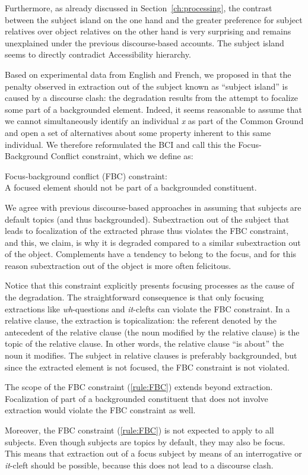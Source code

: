 Furthermore, as already discussed in Section~\ref{ch:processing}, the contrast between the subject island on the one hand and the greater preference for subject relatives over object relatives on the other hand is very surprising and remains unexplained under the previous discourse-based accounts. The subject island seems to directly contradict  Accessibility hierarchy. 

Based on experimental data from English and French, we proposed in \citet[rule (8)]{Abeille.2020.Cognition} that the penalty observed in extraction out of the subject known as ``subject island''
is caused by a discourse clash: the degradation results from the attempt to focalize some part of a backgrounded element. Indeed, it seems reasonable to assume that we cannot simultaneously identify an individual \emph{x} as part of the Common Ground and open a set of alternatives about some property inherent to this same individual. 
We therefore reformulated the BCI and call this the Focus-Background Conflict constraint, which we define as:

\ea Focus-background conflict (FBC) constraint:\\
A focused element should not be part of a backgrounded constituent.
\label{rule:FBC}
\z 

We agree with previous discourse-based approaches in assuming that subjects are default topics (and thus backgrounded). Subextraction out of the subject that leads to focalization of the extracted phrase thus violates the FBC constraint, and this, we claim, is why it is degraded compared to a similar subextraction out of the object. Complements have a tendency to belong to the focus, and for this reason subextraction out of the object is more often felicitous. 

Notice that this constraint explicitly presents focusing processes as the cause of the degradation. The straightforward consequence is that only focusing extractions like \emph{wh}-questions and \emph{it}-clefts can violate the FBC constraint. In a relative clause, the extraction is topicalization: the referent denoted by the antecedent of the relative clause (the noun modified by the relative clause) is the topic of the relative clause. In other words, the relative clause ``is about'' the noun it modifies. The subject in relative clauses is preferably backgrounded, but since the extracted element is not focused, the FBC constraint is not violated. 


The scope of the FBC constraint (\ref{rule:FBC}) extends beyond extraction. Focalization of part of a backgrounded constituent that does not involve extraction would violate the FBC constraint as well.

Moreover, the FBC constraint (\ref{rule:FBC}) is not expected to apply to all subjects. Even though subjects are topics by default, they may also be focus. This means that extraction out of a focus subject by means of an interrogative or \emph{it}-cleft should be possible, because this does not lead to a discourse clash. 
